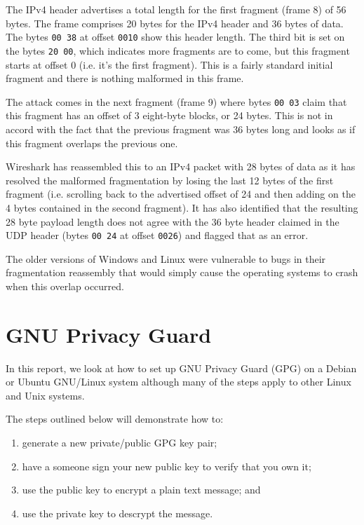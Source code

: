 \documentclass{report}
\begin{document}
The IPv4 header advertises a total length for the first fragment (frame 8)
of 56 bytes. The frame comprises 20 bytes for the IPv4 header and 36 bytes of
data. The bytes \texttt{00 38} at offset \texttt{0010} show this header length.
The third bit is set on the bytes \texttt{20 00}, which indicates more
fragments are to come, but this fragment starts at offset 0 (i.e. it's the first
fragment). This is a fairly standard initial fragment and there is nothing
malformed in this frame.

The attack comes in the next fragment (frame 9) where bytes \texttt{00 03}
claim that this fragment has an offset of 3 eight-byte blocks, or 24 bytes.
This is not in accord with the fact that the previous fragment was 36 bytes
long and looks as if this fragment overlaps the previous one.

Wireshark
has reassembled this to an IPv4 packet with 28 bytes of data as it has
resolved the malformed fragmentation by losing the last 12 bytes of the
first fragment (i.e. scrolling back to the advertised offset of 24 and
then adding on the 4 bytes contained in the second fragment). It has
also identified that the resulting 28 byte payload length does not
agree with the 36 byte header claimed in the UDP header (bytes \texttt{00 24}
at offset \texttt{0026}) and flagged that as an error.

The older versions of Windows and Linux were vulnerable to bugs in
their fragmentation reassembly that would simply cause the operating
systems to crash when this overlap occurred.

\chapter{GNU Privacy Guard}

In this report, we look at how to set up GNU Privacy Guard (GPG)
on a Debian or Ubuntu GNU/Linux
system although many of the steps apply to other Linux and Unix systems.

The steps outlined below will demonstrate how to:

\begin{enumerate}
\item generate a new private/public GPG key pair;
\item have a someone sign your new public key to verify that you own it;
\item use the public key to encrypt a plain text message; and
\item use the private key to descrypt the message.
\end{enumerate}
\end{document}
